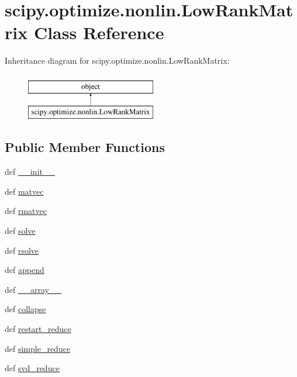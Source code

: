 \hypertarget{classscipy_1_1optimize_1_1nonlin_1_1LowRankMatrix}{}\section{scipy.\+optimize.\+nonlin.\+Low\+Rank\+Matrix Class Reference}
\label{classscipy_1_1optimize_1_1nonlin_1_1LowRankMatrix}
Inheritance diagram for scipy.\+optimize.\+nonlin.\+Low\+Rank\+Matrix\+:\begin{figure}[H]
\begin{center}
\leavevmode
\includegraphics[height=2.000000cm]{classscipy_1_1optimize_1_1nonlin_1_1LowRankMatrix}
\end{center}
\end{figure}
\subsection*{Public Member Functions}
\begin{DoxyCompactItemize}
\item 
def \hyperlink{classscipy_1_1optimize_1_1nonlin_1_1LowRankMatrix_a59246507456c114551abc7414addfe87}{\+\_\+\+\_\+init\+\_\+\+\_\+}
\item 
def \hyperlink{classscipy_1_1optimize_1_1nonlin_1_1LowRankMatrix_a32dcf2f493a492845393578ce346d16d}{matvec}
\item 
def \hyperlink{classscipy_1_1optimize_1_1nonlin_1_1LowRankMatrix_a1fe311b2762e72370821e5d67edb8760}{rmatvec}
\item 
def \hyperlink{classscipy_1_1optimize_1_1nonlin_1_1LowRankMatrix_aabe3b909b7d81c6f035a222600c65154}{solve}
\item 
def \hyperlink{classscipy_1_1optimize_1_1nonlin_1_1LowRankMatrix_a6aa50082100fbe15ebaf06d55fa19bb9}{rsolve}
\item 
def \hyperlink{classscipy_1_1optimize_1_1nonlin_1_1LowRankMatrix_a963ac9fd43fdc6767dbafb065e3250ea}{append}
\item 
def \hyperlink{classscipy_1_1optimize_1_1nonlin_1_1LowRankMatrix_a0e47fb5b921f2e6d70b83740e60524f8}{\+\_\+\+\_\+array\+\_\+\+\_\+}
\item 
def \hyperlink{classscipy_1_1optimize_1_1nonlin_1_1LowRankMatrix_aecc01ca1be90d1dc2f49ca820c9ec14f}{collapse}
\item 
def \hyperlink{classscipy_1_1optimize_1_1nonlin_1_1LowRankMatrix_a1e1e9a503e0f123798c480c8a974ce8c}{restart\+\_\+reduce}
\item 
def \hyperlink{classscipy_1_1optimize_1_1nonlin_1_1LowRankMatrix_aa2e32b1838dbebe6c4de777d964e241f}{simple\+\_\+reduce}
\item 
def \hyperlink{classscipy_1_1optimize_1_1nonlin_1_1LowRankMatrix_ac382e4f7841a239113c154bcd5822f5b}{svd\+\_\+reduce}
\end{DoxyCompactItemize}
